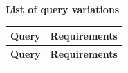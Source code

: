 \documentclass[12pt,a4paper,oneside]{article}
\begin{document}
\begin{flushleft}
\textbf{List of query variations}
\end{flushleft}

\begin{center}
\begin{longtable}{|l|p{8cm}|}
  \hline
  \textbf{Query} & \textbf{Requirements} \\
  \hline\hline
  \endfirsthead
  \hline
  \textbf{Query} & \textbf{Requirements} \\
  \hline\hline
  \endhead
  \endlastfoot


\end{longtable}
\end{center}
\end{document}
